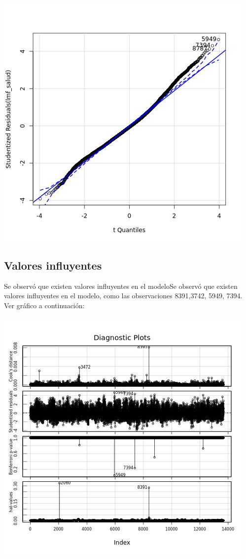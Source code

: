 \documentclass{article}
\begin{document}
\includegraphics[width=\textwidth]{lm_qqplot.jpg}

\subsection{Valores influyentes}
Se observó que existen valores influyentes en el modeloSe observó que existen valores influyentes en el modelo, como las observaciones 8391,3742, 5949, 7394. Ver gráfico a continuación:

\includegraphics[width=\textwidth]{lm_outliers.jpg}
\end{document}
